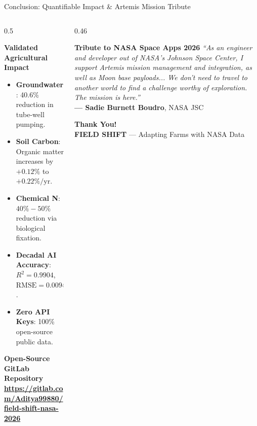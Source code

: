 \documentclass[aspectratio=169,10pt]{beamer}
\begin{document}
\begin{frame}{Conclusion: Quantifiable Impact \& Artemis Mission Tribute}
    \begin{columns}[T]
        \begin{column}{0.5\textwidth}
            \begin{block}{\textbf{Validated Agricultural Impact}}
                \small
                \begin{itemize}
                    \item \textbf{Groundwater}: 40.6\% reduction in tube-well pumping.
                    \item \textbf{Soil Carbon}: Organic matter increases by $+0.12\%$ to $+0.22\%/\text{yr}$.
                    \item \textbf{Chemical N}: $40\%-50\%$ reduction via biological fixation.
                    \item \textbf{Decadal AI Accuracy}: $R^2 = 0.9904$, $\text{RMSE} = 0.0094$.
                    \item \textbf{Zero API Keys}: 100\% open-source public data.
                \end{itemize}
            \end{block}
            \vspace{0.2cm}
            \begin{block}{\textbf{Open-Source GitLab Repository}}
                \footnotesize
                \href{https://gitlab.com/Aditya99880/field-shift-nasa-2026}{\color{nasablue}\textbf{https://gitlab.com/Aditya99880/field-shift-nasa-2026}}
            \end{block}
        \end{column}
        \begin{column}{0.46\textwidth}
            \begin{exampleblock}{\textbf{Tribute to NASA Space Apps 2026}}
                \footnotesize
                \textit{``As an engineer and developer out of NASA's Johnson Space Center, I support Artemis mission management and integration, as well as Moon base payloads... We don't need to travel to another world to find a challenge worthy of exploration. The mission is here.''} \\
                \vspace{0.15cm}
                \raggedleft \textbf{--- Sadie Burnett Boudro}, NASA JSC
            \end{exampleblock}
            \vspace{0.3cm}
            \centering
            \textbf{\Large Thank You!} \\
            \vspace{0.1cm}
            {\small \textbf{FIELD SHIFT} --- Adapting Farms with NASA Data}
        \end{column}
    \end{columns}
\end{frame}
\end{document}
